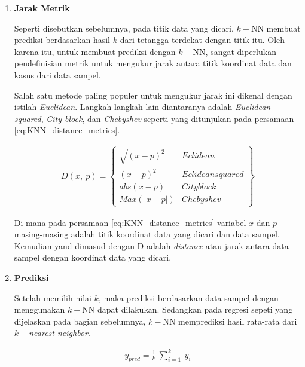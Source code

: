 \begin{enumerate}[label=\textbf{\alph*).}]
	\item \textbf{Jarak Metrik}
	
	Seperti disebutkan sebelumnya, pada titik data yang dicari, $k-$NN membuat prediksi berdasarkan hasil $k$ dari tetangga terdekat dengan titik itu. Oleh karena itu, untuk membuat prediksi dengan $k-$NN, sangat diperlukan pendefinisian metrik untuk mengukur jarak antara titik koordinat data dan kasus dari data sampel. 
	\vspace{1ex}
	
	Salah satu metode paling populer untuk mengukur jarak ini dikenal dengan istilah \textit{Euclidean}. Langkah-langkah lain diantaranya adalah \textit{Euclidean squared}, \textit{City-block}, dan \textit{Chebyshev} seperti yang ditunjukan pada persamaan \ref{eq:KNN_distance_metrics}.
	\vspace{1ex}
	
	\begin{equation}\label{eq:KNN_distance_metrics}
	\begin{split}
	D(x,\ p) =
	\begin{Bmatrix}
	\sqrt{(x - p)^{2}} & Eclidean\\
	(x - p)^{2} & Eclidean squared\\
	abs(x - p) & Cityblock\\
	Max(|x - p|) & Chebyshev
	\end{Bmatrix}
	\end{split}
	\end{equation}
	
	Di mana pada persamaan \ref{eq:KNN_distance_metrics} variabel $x$ dan $p$ masing-masing adalah titik koordinat data yang dicari dan data sampel. Kemudian yand dimasud dengan D adalah \textit{distance} atau jarak antara data sampel dengan koordinat data yang dicari.
	
	\item \textbf{Prediksi}
	
	Setelah memilih nilai $k$, maka prediksi berdasarkan data sampel dengan menggunakan $k-$NN dapat dilakukan. Sedangkan pada regresi sepeti yang dijelaskan pada bagian sebelumnya, $k-$NN memprediksi hasil rata-rata dari $k-$\textit{nearest neighbor}.
	
	\begin{equation}\label{eq: KNN_prediction}
	\begin{split}
	y_{pred} = \frac{1}{k}\ \sum_{i = 1}^{k}\ y_{i}
	\end{split}
	\end{equation}
	

\end{enumerate}
